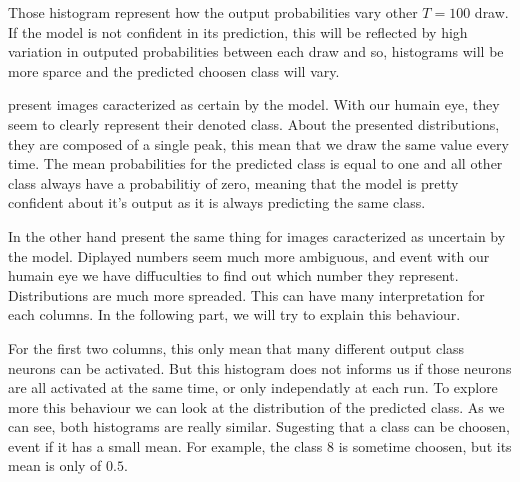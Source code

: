 Those histogram represent how the output probabilities vary other $ T=100 $ draw. If the model is not confident in its prediction, this will be reflected by high variation in outputed probabilities between each draw and so, histograms will be more sparce and the predicted choosen class will vary.

 present images caracterized as certain by the model. With our humain eye, they seem to clearly represent their denoted class. About the presented distributions, they are composed of a single peak, this mean that we draw the same value every time. The mean probabilities for the predicted class is equal to one and all other class always have a probabilitiy of zero, meaning that the model is pretty confident about it's output as it is always predicting the same class. 

In the other hand  present the same thing for images caracterized as uncertain by the model. Diplayed numbers seem much more ambiguous, and event with our humain eye we have diffuculties to find out which number they represent. 
Distributions are much more spreaded. This can have many interpretation for each columns. In the following part, we will try to explain this behaviour.

For the first two columns, this only mean that many different output class neurons can be activated. But this histogram does not informs us if those neurons are all activated at the same time, or only independatly at each run. To explore more this behaviour we can look at the distribution of the predicted class. As we can see, both histograms are really similar. Sugesting that a class can be choosen, event if it has a small mean. For example, the class 8 is sometime choosen, but its mean is only of $ 0.5 $.

